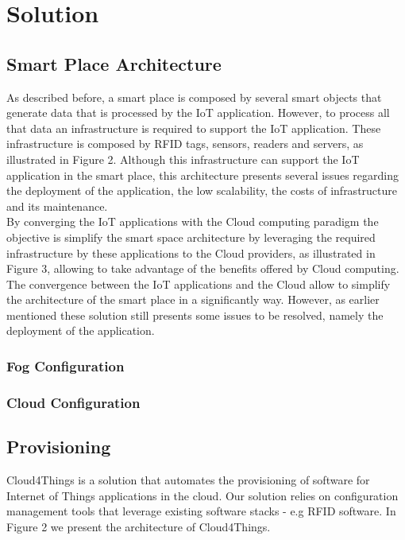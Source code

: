 
\chapter{Solution}
\label{chapter:solution}

\section{Smart Place Architecture}
\label{sec:smart_place_architecture}
As described before, a smart place is composed by several smart objects that generate data that is
processed by the IoT application. However, to process all that data an infrastructure is required to
support the IoT application. These infrastructure is composed by RFID tags, sensors, readers and
servers, as illustrated in Figure 2. Although this infrastructure can support the IoT application
in the smart place, this architecture presents several issues regarding the deployment of the
application, the low scalability, the costs of infrastructure and its maintenance.\\

By converging the IoT applications with the Cloud computing paradigm the objective is simplify the
smart space architecture by leveraging the required infrastructure by these applications to the
Cloud providers, as illustrated in Figure 3, allowing to take advantage of the benefits offered by
Cloud computing.\\

The convergence between the IoT applications and the Cloud allow to simplify the architecture of the
smart place in a significantly way. However, as earlier mentioned these solution still presents some
issues to be resolved, namely the deployment of the application.

\subsection{Fog Configuration}
\label{sub:sol_fog}

\subsection{Cloud Configuration}
\label{sub:sol_cloud}


\section{Provisioning}
\label{sec:provisioning}
Cloud4Things is a solution that automates the provisioning of software for Internet of Things applications
in the cloud. Our solution relies on configuration management tools that leverage existing software
stacks - e.g RFID software. In Figure 2 we present the architecture of Cloud4Things.\\

